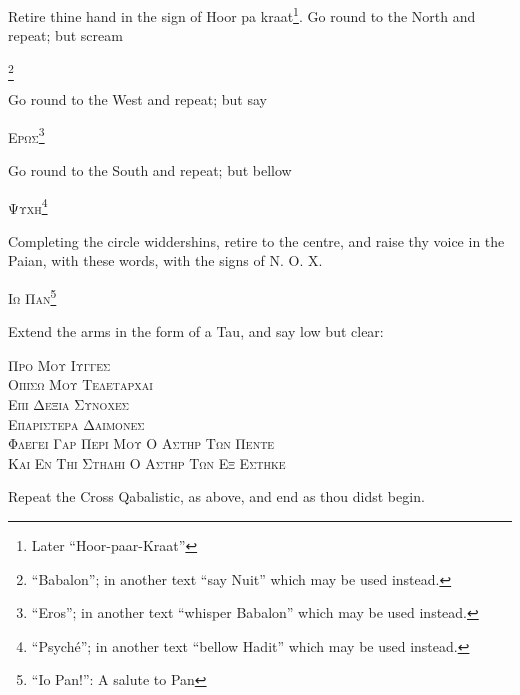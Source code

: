 Retire thine hand in the sign of Hoor pa kraat\footnote{Later \enquote{Hoor-paar-Kraat}}. Go round to the North and repeat; but scream \begin{quoting}[indentfirst=false]\textgreek{\textsc{\GreekBabalon}}\footnote{\enquote{Babalon}; in another text \enquote{say Nuit} which may be used instead.} \end{quoting}

Go round to the West and repeat; but say \begin{quoting}[indentfirst=false]\textgreek{\textsc{Ερωσ}}\footnote{\enquote{Eros}; in another text \enquote{whisper Babalon} which may be used instead.} \end{quoting}

Go round to the South and repeat; but bellow \begin{quoting}[indentfirst=false]\textgreek{\textsc{Ψυχη}}\footnote{\enquote{Psych\'e}; in another text \enquote{bellow Hadit} which may be used instead.} \end{quoting}

Completing the circle widdershins, retire to the centre, and raise thy voice in the Paian, with these words, with the signs of N.\nolinebreak{} O.\nolinebreak{} X.\nolinebreak{}  \begin{quoting}[indentfirst=false]\textgreek{\textsc{Ιω Παν}}\footnote{\enquote{Io Pan!}: A salute to Pan}\end{quoting}

Extend the arms in the form of a Tau, and say low but clear:

\begin{quoting}[indentfirst=false]
\textgreek{\textsc{Προ Μου Ιυγγεσ}} \\
\textgreek{\textsc{Οπισω Μου Τελεταρχαι}} \\
\textgreek{\textsc{Επι Δεξια Συνοχεσ}} \\
\textgreek{\textsc{Επαριστερα Δαιμονεσ}} \\
\textgreek{\textsc{Φλεγει Γαρ Περι Μου Ο Αστηρ Των Πεντε}} \\
\textgreek{\textsc{Και Εν Τηι Στηληι Ο Αστηρ Των Εξ Εστηκε}}\footnotemark
\end{quoting}Repeat the Cross Qabalistic, as above, and end as thou didst begin.
